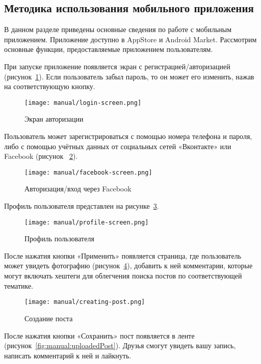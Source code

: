 \subsection{Методика использования мобильного приложения}
\label{sec:manual}

В данном разделе приведены основные сведения по работе с мобильным приложением. 
Приложение доступно в AppStore и Android Market.
Рассмотрим основные функции, предоставляемые приложением пользователям.

При запуске приложение появляется экран с регистрацией/авторизацией (рисунок~\ref{fig:manual:login}).
Если пользователь забыл пароль, то он может его изменить, нажав на
соответствующую кнопку.

\begin{figure}[H]
\centering
	\texttt{[image: manual/login-screen.png]}
	\caption{Экран авторизации}
	\label{fig:manual:login}
\end{figure}

Пользователь может зарегистрироваться с помощью номера телефона и
пароля, либо с помощью учётных данных от социальных сетей «Вконтакте»
или Facebook (рисунок ~\ref{fig:manual:auth}).

\begin{figure}[H]
  \centering
    \texttt{[image: manual/facebook-screen.png]}
    \caption{Авторизация/вход через Facebook}
    \label{fig:manual:auth}
  \end{figure}

Профиль пользователя представлен на рисунке~\ref{fig:manual:profile}.

\begin{figure}[H]
  \centering
    \texttt{[image: manual/profile-screen.png]}
    \caption{Профиль пользователя}
    \label{fig:manual:profile}
  \end{figure}

После нажатия кнопки «Применить» появляется страница, где
пользователь может увидеть фотографию (рисунок~\ref{fig:manual:creatingPost}), добавить к ней
комментарии, которые могут включать хештеги для облегчения поиска постов
по соответствующей тематике.

\begin{figure}[H]
    \centering
      \texttt{[image: manual/creating-post.png]}
      \caption{Создание поста}
      \label{fig:manual:creatingPost}
\end{figure}

После нажатия кнопки «Сохранить» пост появляется в ленте (рисунок~\ref{fig:manual:uploadedPost}). Друзья смогут увидеть вашу запись, написать комментарий к ней и
лайкнуть.

